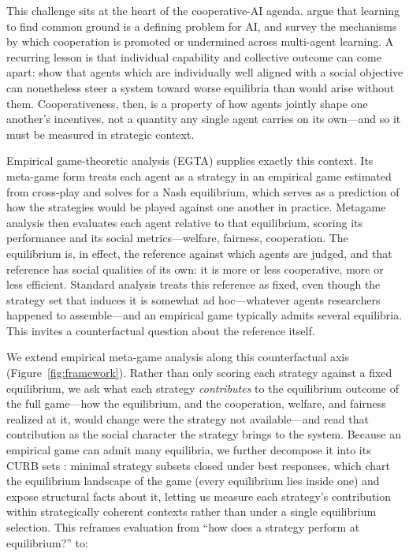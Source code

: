 \documentclass[sigconf,anonymous]{aamas}
\begin{document}
This challenge sits at the heart of the cooperative-AI agenda. \citet{dafoe2021cooperative} argue that learning to find common ground is a defining problem for AI, and \citet{Du2023ARO} survey the mechanisms by which cooperation is promoted or undermined across multi-agent learning. A recurring lesson is that individual capability and collective outcome can come apart: \citet{conitzer2023foundations} show that agents which are individually well aligned with a social objective can nonetheless steer a system toward worse equilibria than would arise without them. Cooperativeness, then, is a property of how agents jointly shape one another's incentives, not a quantity any single agent carries on its own---and so it must be measured in strategic context.

Empirical game-theoretic analysis (EGTA) \citep{wellman2025empirical} supplies exactly this context. Its meta-game form \citep{Li2024AME, smithline2025measuring} treats each agent as a strategy in an empirical game estimated from cross-play and solves for a Nash equilibrium, which serves as a prediction of how the strategies would be played against one another in practice. Metagame analysis then evaluates each agent relative to that equilibrium, scoring its performance and its social metrics---welfare, fairness, cooperation. The equilibrium is, in effect, the reference against which agents are judged, and that reference has social qualities of its own: it is more or less cooperative, more or less efficient. Standard analysis treats this reference as fixed, even though the strategy set that induces it is somewhat ad hoc---whatever agents researchers happened to assemble---and an empirical game typically admits several equilibria. This invites a counterfactual question about the reference itself.

We extend empirical meta-game analysis along this counterfactual axis (Figure~\ref{fig:framework}). Rather than only scoring each strategy against a fixed equilibrium, we ask what each strategy \emph{contributes} to the equilibrium outcome of the full game---how the equilibrium, and the cooperation, welfare, and fairness realized at it, would change were the strategy not available---and read that contribution as the social character the strategy brings to the system. Because an empirical game can admit many equilibria, we further decompose it into its CURB sets \citep{Basu1991StrategySC}: minimal strategy subsets closed under best responses, which chart the equilibrium landscape of the game (every equilibrium lies inside one) and expose structural facts about it, letting us measure each strategy's contribution within strategically coherent contexts rather than under a single equilibrium selection. This reframes evaluation from ``how does a strategy perform at equilibrium?'' to:
\end{document}
